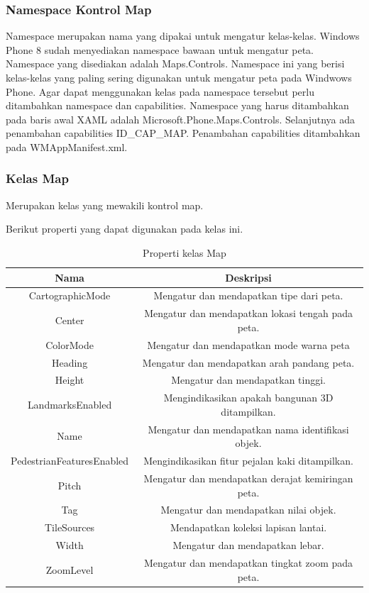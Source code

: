 \subsubsection{Namespace Kontrol Map}
\label{subsubsec:Namespace Kontrol Map}
\hspace{0.5cm} Namespace merupakan nama yang dipakai untuk mengatur kelas-kelas. Windows Phone 8 sudah menyediakan namespace bawaan untuk mengatur peta. Namespace yang disediakan adalah Maps.Controls. Namespace ini yang berisi kelas-kelas yang paling sering digunakan untuk mengatur peta pada Windwows Phone.  Agar dapat menggunakan kelas pada namespace tersebut perlu ditambahkan namespace dan capabilities. Namespace yang harus ditambahkan pada baris awal XAML adalah Microsoft.Phone.Maps.Controls. Selanjutnya ada penambahan capabilities ID\_CAP\_MAP. Penambahan capabilities ditambahkan pada WMAppManifest.xml.

\subsubsection{Kelas Map}
\label{subsubsec:Kelas Map}
\hspace{0.5cm} Merupakan kelas yang mewakili kontrol map.

Berikut properti yang dapat digunakan pada kelas ini.
\begin{table}[h]
	\centering
		\begin{tabular}{ |c||c|}
				\hline
					Nama & Deskripsi \\ \hline
					CartographicMode & Mengatur dan mendapatkan tipe dari peta. \\ \hline
					Center & Mengatur dan mendapatkan lokasi tengah pada peta. \\ \hline
					ColorMode & Mengatur dan mendapatkan mode warna peta \\ \hline
					Heading & Mengatur dan mendapatkan arah pandang peta. \\ \hline
					Height & Mengatur dan mendapatkan tinggi. \\ \hline
					LandmarksEnabled & Mengindikasikan apakah bangunan 3D ditampilkan. \\ \hline
					Name & Mengatur dan mendapatkan nama identifikasi objek. \\ \hline
					PedestrianFeaturesEnabled & Mengindikasikan fitur pejalan kaki ditampilkan. \\ \hline
					Pitch & Mengatur dan mendapatkan derajat kemiringan peta. \\ \hline
					Tag & Mengatur dan mendapatkan nilai objek. \\ \hline
					TileSources & Mendapatkan koleksi lapisan lantai. \\ \hline
					Width & Mengatur dan mendapatkan lebar. \\ \hline
					ZoomLevel & Mengatur dan mendapatkan tingkat zoom pada peta. \\ \hline
				\hline
		\end{tabular}
	\caption{Properti kelas Map}
	\label{tab:PropertiKelasMap}
\end{table}

